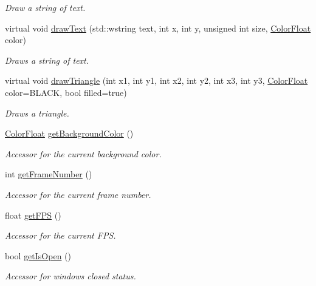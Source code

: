 \begin{DoxyCompactItemize}
\begin{DoxyCompactList}\small\item\em Draw a string of text. \end{DoxyCompactList}\item 
virtual void \hyperlink{classtsgl_1_1_canvas_a1873adb0f3f43e3ebec33fdaf6c6a3d5}{draw\+Text} (std\+::wstring text, int x, int y, unsigned int size, \hyperlink{structtsgl_1_1_color_float}{Color\+Float} color)
\begin{DoxyCompactList}\small\item\em Draws a string of text. \end{DoxyCompactList}\item 
virtual void \hyperlink{classtsgl_1_1_canvas_a8abc9ed7d3c55c5d701009040c65000e}{draw\+Triangle} (int x1, int y1, int x2, int y2, int x3, int y3, \hyperlink{structtsgl_1_1_color_float}{Color\+Float} color=B\+L\+A\+C\+K, bool filled=true)
\begin{DoxyCompactList}\small\item\em Draws a triangle. \end{DoxyCompactList}\item 
\hyperlink{structtsgl_1_1_color_float}{Color\+Float} \hyperlink{classtsgl_1_1_canvas_a2b39e50888d61e88527a66ac0f6ac880}{get\+Background\+Color} ()
\begin{DoxyCompactList}\small\item\em Accessor for the current background color. \end{DoxyCompactList}\item 
int \hyperlink{classtsgl_1_1_canvas_af4f8f2b1abd27316a4a39ae097407d37}{get\+Frame\+Number} ()
\begin{DoxyCompactList}\small\item\em Accessor for the current frame number. \end{DoxyCompactList}\item 
float \hyperlink{classtsgl_1_1_canvas_a1c8ac321138948650a3006f325dfb886}{get\+F\+P\+S} ()
\begin{DoxyCompactList}\small\item\em Accessor for the current F\+P\+S. \end{DoxyCompactList}\item 
bool \hyperlink{classtsgl_1_1_canvas_aa933363de2d19ec516603a2ed3b4f817}{get\+Is\+Open} ()
\begin{DoxyCompactList}\small\item\em Accessor for window\textquotesingle{}s closed status. \end{DoxyCompactList}\item 

\end{DoxyCompactItemize}
